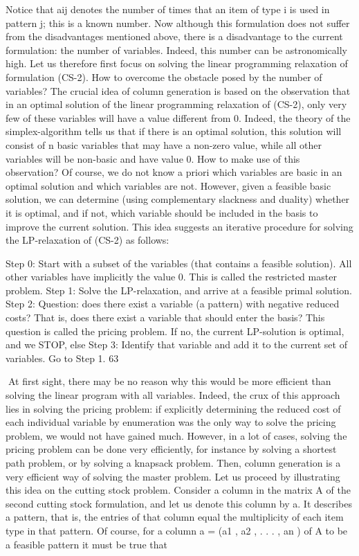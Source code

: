 \documentclass[titlepage]{book}
\theoremstyle{plain}
\theoremstyle{definition}
\theoremstyle{remark}
\begin{document}
Notice that aij denotes the number of times that an item of type i is used in pattern j; this is a known
number. Now although this formulation does not suffer from the disadvantages mentioned above, there
is a disadvantage to the current formulation: the number of variables. Indeed, this number can be
astronomically high.
Let us therefore first focus on solving the linear programming relaxation of formulation (CS-2). How to
overcome the obstacle posed by the number of variables? The crucial idea of column generation is based
on the observation that in an optimal solution of the linear programming relaxation of (CS-2), only very
few of these variables will have a value different from 0. Indeed, the theory of the simplex-algorithm
tells us that if there is an optimal solution, this solution will consist of n basic variables that may have
a non-zero value, while all other variables will be non-basic and have value 0.
How to make use of this observation? Of course, we do not know a priori which variables are basic in an
optimal solution and which variables are not. However, given a feasible basic solution, we can determine
(using complementary slackness and duality) whether it is optimal, and if not, which variable should
be included in the basis to improve the current solution. This idea suggests an iterative procedure for
solving the LP-relaxation of (CS-2) as follows:

Step 0: Start with a subset of the variables (that contains a feasible solution). All other variables have
implicitly the value 0. This is called the restricted master problem.
Step 1: Solve the LP-relaxation, and arrive at a feasible primal solution.
Step 2: Question: does there exist a variable (a pattern) with negative reduced costs? That is, does there
exist a variable that should enter the basis? This question is called the pricing problem. If no, the
current LP-solution is optimal, and we STOP, else
Step 3: Identify that variable and add it to the current set of variables. Go to Step 1.
63

At first sight, there may be no reason why this would be more efficient than solving the linear program
with all variables. Indeed, the crux of this approach lies in solving the pricing problem: if explicitly
determining the reduced cost of each individual variable by enumeration was the only way to solve the
pricing problem, we would not have gained much. However, in a lot of cases, solving the pricing problem
can be done very efficiently, for instance by solving a shortest path problem, or by solving a knapsack
problem. Then, column generation is a very efficient way of solving the master problem. Let us proceed
by illustrating this idea on the cutting stock problem.
Consider a column in the matrix A of the second cutting stock formulation, and let us denote this
column by a. It describes a pattern, that is, the entries of that column equal the multiplicity of each
item type in that pattern. Of course, for a column a = (a1 , a2 , . . . , an ) of A to be a feasible pattern it
must be true that
\end{document}
